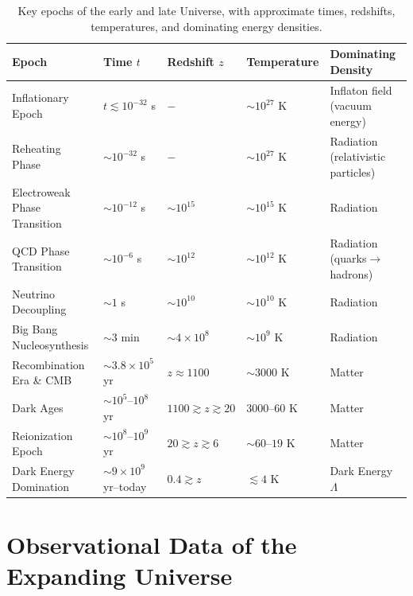 \documentclass{book}
\begin{document}
	\begin{table}[h!]
		\centering
		\renewcommand{\arraystretch}{1.4}
		\begin{tabular}{l l l l p{2.2cm}}
			\hline\hline
			\textbf{Epoch} & \textbf{Time $t$} & \textbf{Redshift $z$} & \textbf{Temperature} & \textbf{Dominating Density} \\
			\hline
			Inflationary Epoch        & $t \lesssim 10^{-32}$ s       & $-$                        & $\sim 10^{27}$ K              & Inflaton field (vacuum $\, \, \quad$ energy) \\
			Reheating Phase           & $\sim 10^{-32}$ s             & $-$                        & $\sim 10^{27}$ K              & Radiation (relativistic particles) \\
			Electroweak Phase Transition & $\sim 10^{-12}$ s          & $\sim 10^{15}$             & $\sim 10^{15}$ K              & Radiation \\
			QCD Phase Transition      & $\sim 10^{-6}$ s              & $\sim 10^{12}$             & $\sim 10^{12}$ K              & Radiation (quarks$\to$ hadrons) \\
			Neutrino Decoupling       & $\sim 1$ s                    & $\sim 10^{10}$             & $\sim 10^{10}$ K              & Radiation \\
			Big Bang Nucleosynthesis  & $\sim 3$ min                  & $\sim 4\times10^{8}$       & $\sim 10^{9}$ K               & Radiation \\
			Recombination Era \& CMB  & $\sim 3.8\times10^{5}$ yr    & $z \approx 1100$           & $\sim 3000$ K                 & Matter \\
			Dark Ages                 & $\sim 10^{5}$--$10^{8}$ yr   & $1100 \gtrsim z \gtrsim 20$ & $3000$--$60$ K               & Matter \\
			Reionization Epoch        & $\sim 10^{8}$--$10^{9}$ yr   & $20 \gtrsim z \gtrsim 6$   & $\sim 60$--$19$ K             & Matter \\
			Dark Energy Domination    & $\sim 9\times10^{9}$ yr--today & $0.4 \gtrsim z$          & $\lesssim 4$ K                & Dark Energy $\Lambda$ \\
			\hline\hline
		\end{tabular}
		\caption{Key epochs of the early and late Universe, with approximate times, redshifts, temperatures, and dominating energy densities.}
		\label{tab:cosmic_epochs}
	\end{table}	
	\chapter{Observational Data of the Expanding Universe}
\end{document}
